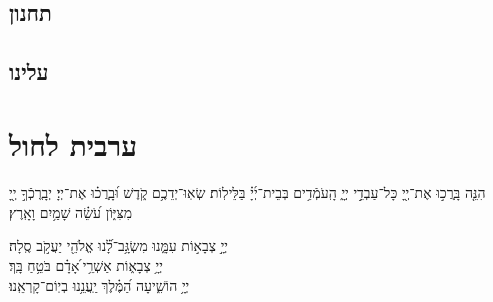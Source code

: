 \documentclass[twoside, openany, parskip=half, 11pt]{book}
\begin{document}
\label{mincha avinu malkeinu}

\\

\avinumalkeinu

\vfill
\sepline
\clearpage


\section*{ תחנון }


\nefilasapayim

\vspace{-.5\baselineskip}
\shomeryisroel 

\clearpage
 
\fullkaddish


\label{mincha aleinu}
\section*{ עלינו }


\aleinu


\vfill

\quad{}\quad{}

\chapter[ערבית לחול]{ ערבית לחול }

 
הִנֵּ֤ה בָּֽרֲכ֣וּ אֶת־יְ֖יָ כָּל־עַבְדֵ֣י יְיָ֑ הָֽעֹמְֿדִ֥ים בְּבֵית־יְ֜יָ֗ בַּלֵּילֽוֹת׃ שְׂאֽוּ־יְדֵכֶ֥ם קֹ֑דֶשׁ וּ֝בָֽרֲכ֗וּ אֶת־יְיָ׃ יְבָֽרֶכְֿךָ֣ יְ֖יָ מִצִּיּ֑וֹן עֹ֝שֵׂ֗ה שָׁמַ֥יִם וָאָֽרֶץ׃
 
 יְיָ֣ צְבָא֣וֹת עִמָּ֑נוּ מִשְׂגָּ֥ב־לָ֝֗נוּ אֱלֹהֵ֖י יַעֲקֹ֣ב סֶֽלָה׃ 	 \hfill	
  \\ 
יְיָ֥ צְבָא֑וֹת אַשְׁרֵ֥י ֝אָדָ֗ם בֹּטֵ֥חַ בָּֽךְ׃  \hfill 
{} \\
 יְיָ֥ הוֹשִׁ֑יעָה הַ֝מֶּ֗לֶךְ יַֽעֲנֵ֥נוּ בְיֽוֹם־קָרְאֵֽנוּ׃  \hfill {}
\end{document}
